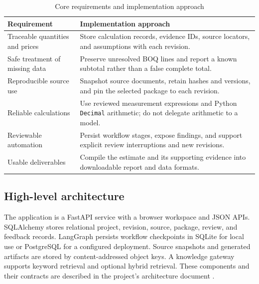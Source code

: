 \begin{table}[htbp]
\centering
\caption{Core requirements and implementation approach}
\label{tab:requirements}
\begin{tabularx}{\textwidth}{p{}X}
\toprule
\textbf{Requirement} & \textbf{Implementation approach}\\
\midrule
Traceable quantities and prices & Store calculation records, evidence IDs, source locators, and assumptions with each revision.\\
Safe treatment of missing data & Preserve unresolved BOQ lines and report a known subtotal rather than a false complete total.\\
Reproducible source use & Snapshot source documents, retain hashes and versions, and pin the selected package to each revision.\\
Reliable calculations & Use reviewed measurement expressions and Python \texttt{Decimal} arithmetic; do not delegate arithmetic to a model.\\
Reviewable automation & Persist workflow stages, expose findings, and support explicit review interruptions and new revisions.\\
Usable deliverables & Compile the estimate and its supporting evidence into downloadable report and data formats.\\
\bottomrule
\end{tabularx}
\end{table}

\subsection{High-level architecture}
The application is a FastAPI service with a browser workspace and JSON APIs. SQLAlchemy stores relational project, revision, source, package, review, and feedback records. LangGraph persists workflow checkpoints in SQLite for local use or PostgreSQL for a configured deployment. Source snapshots and generated artifacts are stored by content-addressed object keys. A knowledge gateway supports keyword retrieval and optional hybrid retrieval. These components and their contracts are described in the project's architecture document \cite{tenderworks2026}.

